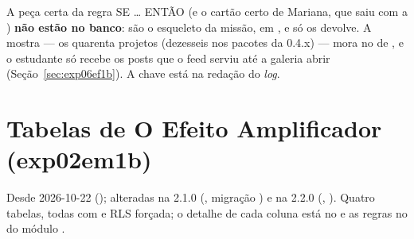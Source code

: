 \begin{regra}
A peça certa da regra SE \ldots{} ENTÃO (e o cartão certo de Mariana, que saiu
com a ) \textbf{não estão no banco}: são o esqueleto da missão, em , e só
 os devolve. A mostra --- os
quarenta projetos (dezesseis nos pacotes da 0.4.x) --- mora no  de , e o
estudante só recebe os posts que o feed serviu até a galeria abrir
(Seção~\ref{sec:exp06ef1b}). A chave  está na redação do \emph{log}.
\end{regra}

\section{Tabelas de O Efeito Amplificador (exp02em1b)}

Desde 2026-10-22 (); alteradas na 2.1.0 (,
migração ) e na 2.2.0
(, ). Quatro tabelas, todas com 
 e RLS forçada; o detalhe de cada coluna está no
 e as regras no  do módulo
.

